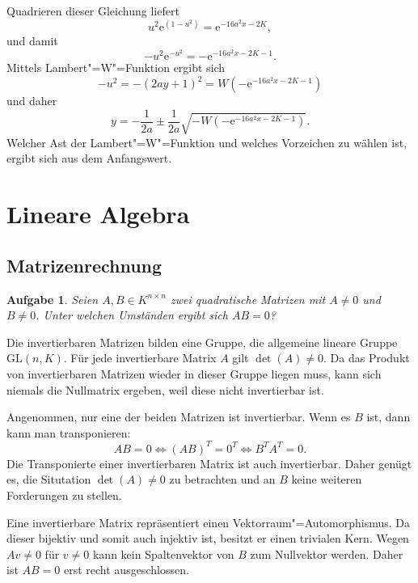 \documentclass[a4paper,10pt,fleqn,twoside]{scrartcl}
\numberwithin{equation}{section}
\newcommand{\ee}{\mathrm e}
\newcommand{\strong}[1]{{\normalfont\sffamily\bfseries #1}}
\theoremstyle{Aufgabe}
\newtheorem{Aufgabe}{\sffamily Aufgabe}[section]
\begin{document}
Quadrieren dieser Gleichung liefert
\begin{equation}
u^2\ee^{(1-u^2)} = \ee^{-16a^2x-2K},
\end{equation}
und damit
\begin{equation}
-u^2\ee^{-u^2} = -\ee^{-16a^2x-2K-1}.
\end{equation}
Mittels Lambert"=W"=Funktion ergibt sich
\begin{equation}
-u^2 = -(2ay+1)^2 = W(-\ee^{-16a^2x-2K-1})
\end{equation}
und daher
\begin{equation}
y = -\frac{1}{2a}\pm\frac{1}{2a}\sqrt{-W(-\ee^{-16a^2x-2K-1})}.
\end{equation}
Welcher Ast der Lambert"=W"=Funktion und welches Vorzeichen
zu wählen ist, ergibt sich aus dem Anfangswert.

\newpage
\section{Lineare Algebra}
\subsection{Matrizenrechnung}
\begin{Aufgabe}
Seien $A,B\in K^{n\times n}$ zwei quadratische Matrizen mit $A\ne 0$
und $B\ne 0$. Unter welchen Umständen ergibt sich $AB=0$?
\end{Aufgabe}

\noindent\strong{Lösung.}
Die invertierbaren Matrizen bilden eine Gruppe, die allgemeine
lineare Gruppe $\mathrm{GL}(n,K)$. Für jede invertierbare Matrix $A$
gilt $\det(A)\ne 0$. Da das Produkt von invertierbaren Matrizen
wieder in dieser Gruppe liegen muss, kann sich niemals die Nullmatrix
ergeben, weil diese nicht invertierbar ist.

Angenommen, nur eine der beiden Matrizen ist invertierbar. Wenn es
$B$ ist, dann kann man transponieren:%
\begin{equation}
AB=0 \iff (AB)^T = 0^T \iff B^T A^T = 0.
\end{equation}
Die Transponierte einer invertierbaren Matrix ist auch invertierbar.
Daher genügt es, die Situtation $\det(A)\ne 0$ zu betrachten
und an $B$ keine weiteren Forderungen zu stellen.

Eine invertierbare Matrix repräsentiert einen
Vektorraum"=Automorphismus. Da dieser bijektiv und somit auch injektiv
ist, besitzt er einen trivialen Kern. Wegen $Av\ne 0$ für $v\ne 0$
kann kein Spaltenvektor von $B$ zum Nullvektor werden. Daher ist $AB=0$
erst recht ausgeschlossen.
\end{document}
